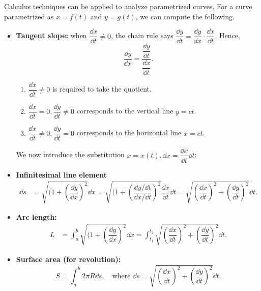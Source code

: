 Calculus techniques can be applied to analyze parametrized curves. 
    For a curve parametrized as $x = f(t)$ and $y = g(t)$, we can compute the following.
\begin{itemize}
    \item \textbf{Tangent slope:} when $\dfrac{\dd x}{\dd t} \neq 0$, the chain rule says $\dfrac{\dd y}{\dd t} = \dfrac{\dd y}{\dd x}\cdot \dfrac{\dd x}{\dd t}$. Hence,
    \[ \dfrac{\dd y}{\dd x} = \dfrac{\dfrac{\dd y}{\dd t}}{\dfrac{\dd x}{\dd t}}.\]
\begin{rmk}
    \begin{enumerate}
        \item $\dfrac{\dd x}{\dd t} \neq 0$ is required to take the quotient.
        
        \item $\dfrac{\dd x}{\dd t} = 0, \dfrac{\dd y}{\dd t} \neq 0$ corresponds to the vertical line $y = ct$.

        \item $\dfrac{\dd x}{\dd t} \neq 0, \dfrac{\dd y}{\dd t} = 0$ corresponds to the horizontal line $x = ct$.
    \end{enumerate}
\end{rmk}

We now introduce the substitution $x = x(t), \dd x = \dfrac{\dd x}{\dd t} \dd t$: 
    \item \textbf{Infinitesimal line element}
    \begin{align*}
        \dd s &= \sqrt{(1+ \left(\dfrac{\dd y}{\dd x}\right)^2} \dd x = \sqrt{(1+ \left(\dfrac{\dd y/\dd t}{\dd x/\dd t}\right)^2} \dfrac{\dd x}{\dd t} \dd t = \sqrt{\left(\dfrac{\dd x}{\dd t}\right)^2 + \left(\dfrac{\dd y}{\dd t}\right)^2} \dd t. 
    \end{align*}

    
    \item \textbf{Arc length:}
    \begin{align*}
        L &= \int_a^b \sqrt{(1+ \left(\dfrac{\dd y}{\dd x}\right)^2} \dd x = \int_{t_1}^{t_2} \sqrt{\left(\dfrac{\dd x}{\dd t}\right)^2 + \left(\dfrac{\dd y}{\dd t}\right)^2} \dd t. 
    \end{align*}
    
    
    \item \textbf{Surface area (for revolution):}
    \[ S = \int_a^b 2\pi R \dd s, \quad \text{where } \dd s = \sqrt{\left(\dfrac{\dd x}{\dd t}\right)^2 + \left(\dfrac{\dd y}{\dd t}\right)^2} \dd t. \]
\end{itemize}


